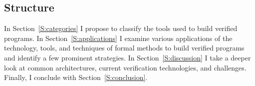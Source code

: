 \subsection{Structure}

In Section~\ref{S:categories} I propose to classify the tools used to build
verified programs. In Section~\ref{S:applications} I examine various
applications of the technology, tools, and techniques of formal methods to build
verified programs and identify a few prominent strategies. In
Section~\ref{S:discussion} I take a deeper look at common architectures, current
verification technologies, and challenges. Finally, I conclude with
Section~\ref{S:conclusion}.
